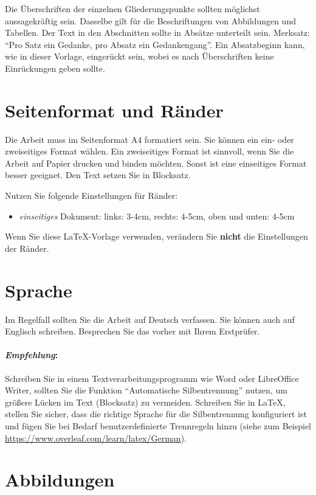 Die Überschriften der einzelnen Gliederungspunkte sollten möglichst aussagekräftig sein. Dasselbe gilt für die Beschriftungen von Abbildungen und Tabellen. Der Text in den Abschnitten sollte in Absätze unterteilt sein. Merksatz: \enquote{Pro Satz ein Gedanke, pro Absatz ein Gedankengang}. Ein Absatzbeginn kann, wie in dieser Vorlage, eingerückt sein, wobei es nach Überschriften keine Einrückungen geben sollte.


\section{Seitenformat und Ränder}

Die Arbeit muss im Seitenformat A4 formatiert sein. Sie können ein ein- oder zweiseitiges Format wählen. Ein zweiseitiges Format ist sinnvoll, wenn Sie die Arbeit auf Papier drucken und binden möchten. Sonst ist eine einseitiges Format besser geeignet. Den Text setzen Sie in Blocksatz.

Nutzen Sie folgende Einstellungen für Ränder:
\begin{itemize}
    \item \textit{einseitiges} Dokument: links: 3-4cm, rechts: 4-5cm, oben und unten: 4-5cm
\end{itemize}

Wenn Sie diese \LaTeX{}-Vorlage verwenden, verändern Sie \textbf{nicht} die Einstellungen der Ränder.

\section{Sprache}

Im Regelfall sollten Sie die Arbeit auf Deutsch verfassen. Sie können auch auf Englisch schreiben. Besprechen Sie das vorher mit Ihrem Erstprüfer.

\paragraph{\textit{Empfehlung}:}
Schreiben Sie in einem Textverarbeitungsprogramm wie Word oder LibreOffice Writer, sollten Sie die Funktion \enquote{Automatische Silbentrennung} nutzen, um größere Lücken im Text (Blocksatz) zu vermeiden. Schreiben Sie in \LaTeX{}, stellen Sie sicher, dass die richtige Sprache für die Silbentrennung konfiguriert ist und fügen Sie bei Bedarf benutzerdefinierte Trennregeln hinzu (siehe zum Beispiel \url{https://www.overleaf.com/learn/latex/German}).

\section{Abbildungen}

